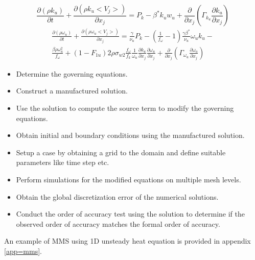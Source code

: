 \begin{equation}
\frac{\partial (\rho k_u)}{\partial t}+\frac{\partial (\rho k_u <V_j>)}{\partial x_j}=P_k-\beta^*k_u w_u+\frac{\partial}{\partial x_j}(\Gamma_{k_u}\frac{\partial k_u}{\partial x_j})
\end{equation}
\begin{equation}
\begin{split}
\frac{\partial (\rho \omega_u)}{\partial t}+\frac{\partial (\rho \omega_u <V_j>)}{\partial x_j}=\frac{\gamma}{\nu_u}P_k-(\frac{1}{f_\omega}-1)\frac{\gamma\beta^*}{\nu_u}\omega_uk_u-\\\frac{\beta\rho\omega_u^2}{f_\omega}+(1-F_{1u})2\rho\sigma_{w2}\frac{f_\omega}{f_k}\frac{1}{\omega_u}\frac{\partial k_u}{\partial x_j}\frac{\partial \omega_u}{\partial x_j}+\frac{\partial}{\partial x_j}(\Gamma_{\omega_u}\frac{\partial \omega_u}{\partial x_j})
\end{split}
\end{equation}
\begin{itemize}
  \item Determine the governing equations.
  \item Construct a manufactured solution.
  \item Use the solution to compute the source term to modify the governing equations.
  \item Obtain initial and boundary conditions using the manufactured solution.
  \item Setup a case by obtaining a grid to the domain and define suitable parameters like time step etc.
  \item Perform simulations for the modified equations on multiple mesh levels.
  \item Obtain the global discretization error of the numerical solutions.
  \item Conduct the order of accuracy test using the solution to determine if the observed order of accuracy matches the formal order of accuracy.
\end{itemize}
\newpage
An example of MMS using 1D unsteady heat equation is provided in appendix \ref{app=mms}.
